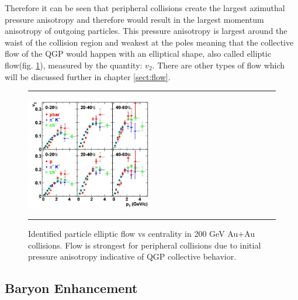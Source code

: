 Therefore it can be seen that peripheral collisions create the largest azimuthal pressure anisotropy and therefore would result in the largest momentum anisotropy of outgoing particles. This pressure anisotropy is largest around the waist of the collision region and weakest at the poles meaning that the collective flow of the QGP would happen with an elliptical shape, also called elliptic flow(fig. \ref{fig:v2auau}), measured by the quantity: $v_2$. There are other types of flow which will be discussed further in chapter \ref{sect:flow}.
    
\begin{figure}[htbp]
\centering 	\rule{35em}{0.5pt}
    \includegraphics[width=0.5\textwidth]{prevplots/v2auau.jpg}

	\caption[Identified particle elliptic flow vs centrality in 200 GeV Au+Au collisions]{Identified particle elliptic flow vs centrality in 200 GeV Au+Au collisions. Flow is strongest for peripheral collisions due to initial pressure anisotropy indicative of QGP collective behavior. \citep{Adler:2003kt}}
\label{fig:v2auau}	\rule{35em}{0.5pt}
\end{figure}

\subsection{Baryon Enhancement}

